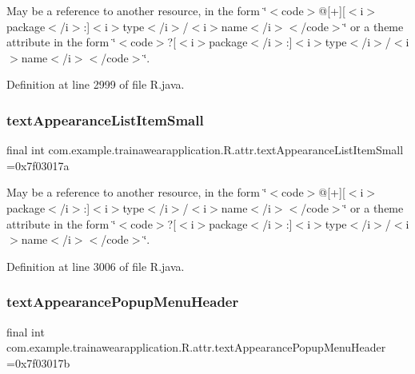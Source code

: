 May be a reference to another resource, in the form \char`\"{}$<$code$>$@\mbox{[}+\mbox{]}\mbox{[}$<$i$>$package$<$/i$>$\+:\mbox{]}$<$i$>$type$<$/i$>$/$<$i$>$name$<$/i$>$$<$/code$>$\char`\"{} or a theme attribute in the form \char`\"{}$<$code$>$?\mbox{[}$<$i$>$package$<$/i$>$\+:\mbox{]}$<$i$>$type$<$/i$>$/$<$i$>$name$<$/i$>$$<$/code$>$\char`\"{}. 

Definition at line 2999 of file R.\+java.

\mbox{\label{classcom_1_1example_1_1trainawearapplication_1_1_r_1_1attr_af6cd8bc5bbab68ceb847067da5b4be02}} 
\subsubsection{\texorpdfstring{textAppearanceListItemSmall}{textAppearanceListItemSmall}}
{\footnotesize\ttfamily final int com.\+example.\+trainawearapplication.\+R.\+attr.\+text\+Appearance\+List\+Item\+Small =0x7f03017a\hspace{0.3cm}{\ttfamily [static]}}

May be a reference to another resource, in the form \char`\"{}$<$code$>$@\mbox{[}+\mbox{]}\mbox{[}$<$i$>$package$<$/i$>$\+:\mbox{]}$<$i$>$type$<$/i$>$/$<$i$>$name$<$/i$>$$<$/code$>$\char`\"{} or a theme attribute in the form \char`\"{}$<$code$>$?\mbox{[}$<$i$>$package$<$/i$>$\+:\mbox{]}$<$i$>$type$<$/i$>$/$<$i$>$name$<$/i$>$$<$/code$>$\char`\"{}. 

Definition at line 3006 of file R.\+java.

\mbox{\label{classcom_1_1example_1_1trainawearapplication_1_1_r_1_1attr_ab34a959b991c47f631240841e55d64af}} 
\subsubsection{\texorpdfstring{textAppearancePopupMenuHeader}{textAppearancePopupMenuHeader}}
{\footnotesize\ttfamily final int com.\+example.\+trainawearapplication.\+R.\+attr.\+text\+Appearance\+Popup\+Menu\+Header =0x7f03017b\hspace{0.3cm}{\ttfamily [static]}}


